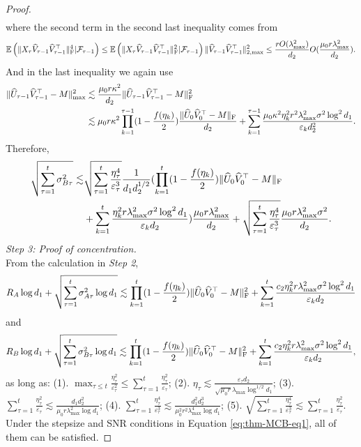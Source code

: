 \documentclass[12pt]{article}
\newcommand\fro[1]{\| #1 \|_{\rm{F}}}
\def\EE{{\mathbb E}}
\theoremstyle{plain}
\begin{document}
\begin{proof}
\begin{align*}
    \end{align*}
    where the second term in the second last inequality comes from
    $$
    \EE\left(\fro{X_{\tau}\widehat{V}_{\tau-1}\widehat{V}_{\tau-1}^{\top}}^4|\mathcal{F}_{\tau-1}\right)\leq \EE\left(\fro{X_{\tau}\widehat{V}_{\tau-1}\widehat{V}_{\tau-1}^{\top}}^2|\mathcal{F}_{\tau-1}\right)\|\widehat{V}_{\tau-1}\widehat{V}_{\tau-1}^{\top}\|_{2,\max}^2\leq \frac{rO(\lambda_{\max}^2)}{d_2}O(\frac{\mu_0r\lambda_{\max}^2}{d_2}).
    $$ 
    And in the last inequality we again use 
    \begin{align*}
    \|\widehat{U}_{\tau-1}\widehat{V}_{\tau-1}^{\top} - M\|_{\max}^2&\lesssim \frac{\mu_0r\kappa^2}{d_2}\fro{\widehat{U}_{\tau-1}\widehat{V}_{\tau-1}^{\top} - M}^2\\
    &\lesssim \mu_0r\kappa^2\prod_{k=1}^{\tau-1} (1-\frac{f(\eta_k)}{2})\frac{\fro{\widehat{U}_0\widehat{V}_0^{\top}-M}}{d_2} + \sum_{k=1}^{\tau-1}\frac{\mu_0\kappa^2\eta_k^2r^2\lambda_{\max}^2\sigma^2\log^2d_1}{\varepsilon_k d_2^2}.
    \end{align*}
    Therefore, 
    \begin{align*}
    \sqrt{\sum_{\tau=1}^t \sigma_{B\tau}^2} \lesssim& \sqrt{\sum_{\tau=1}^t \frac{\eta_{\tau}^4}{\varepsilon_{\tau}^3}}\frac{1}{d_1d_2^{1/2}}(\prod_{k=1}^{t} (1-\frac{f(\eta_k)}{2})\fro{\widehat{U}_0\widehat{V}_0^{\top}-M} \\
    &+ \sum_{k=1}^{t}\frac{\eta_k^2r\lambda_{\max}^2\sigma^2\log^2d_1}{\varepsilon_kd_2})\frac{\mu_0r\lambda_{\max}^2}{d_2} + \sqrt{\sum_{\tau=1}^t \frac{\eta_{\tau}^4}{\varepsilon_{\tau}^3}}\frac{\mu_0r\lambda_{\max}^2\sigma^2}{d_2}.
    \end{align*}
    \emph{Step 3: Proof of concentration.} \\
    From the calculation in \emph{Step 2}, 
    $$
    R_A\log d_1 + \sqrt{\sum_{\tau=1}^t \sigma_{A\tau}^2\log d_1} \lesssim \prod_{k=1}^{t} (1-\frac{f(\eta_k)}{2}) \fro{\widehat{U}_0\widehat{V}_0^{\top}-M}^2 + \sum_{k=1}^{t}\frac{c_2\eta_k^2r\lambda_{\max}^2\sigma^2\log^2d_1}{\varepsilon_kd_2}
    $$
    and 
    $$
    R_B\log d_1 + \sqrt{\sum_{\tau=1}^t \sigma_{B\tau}^2\log d_1} \lesssim \prod_{k=1}^{t} (1-\frac{f(\eta_k)}{2}) \fro{\widehat{U}_0\widehat{V}_0^{\top}-M}^2 + \sum_{k=1}^{t}\frac{c_2\eta_k^2r\lambda_{\max}^2\sigma^2\log^2d_1}{\varepsilon_kd_2},
    $$ 
    as long as: (1). $\max_{\tau\leq t}\frac{\eta_{\tau}^2}{\varepsilon_{\tau}^2}\leq \sum_{\tau=1}^t \frac{\eta_{\tau}^2}{\varepsilon_{\tau}}$; (2). $\eta_{\tau}\lesssim \frac{\varepsilon_{\tau}d_2}{\sqrt{\mu_0r}\lambda_{\max}\log^{1/2}d_1}$; (3). $\sum_{\tau=1}^t \frac{\eta_{\tau}^2}{\varepsilon_{\tau}} \lesssim \frac{d_1d_2^2}{\mu_0r\lambda_{\max}^2\log d_1}$; (4). $\sum_{\tau=1}^t \frac{\eta_{\tau}^4}{\varepsilon_{\tau}^3}\lesssim \frac{d_1^2d_2^3}{\mu_0^2r^2\lambda_{\max}^4\log d_1}$; (5). $\sqrt{\sum_{\tau=1}^t \frac{\eta_{\tau}^4}{\varepsilon_{\tau}^3}} \lesssim \sum_{\tau=1}^t\frac{\eta_{\tau}^2}{\varepsilon_{\tau}}$. 
    Under the stepsize and SNR conditions in Equation \ref{eq:thm-MCB-eq1}, all of them can be satisfied.
    

\end{proof}
\end{document}
